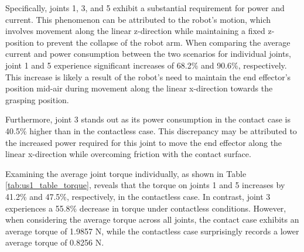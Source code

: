 \documentclass[report.tex]{subfiles}
\begin{document}
    Specifically, joints 1, 3, and 5 exhibit a substantial requirement for power and current. This phenomenon can be attributed to the robot's motion, which involves movement along the linear z-direction while maintaining a fixed z-position to prevent the collapse of the robot arm. When comparing the average current and power consumption between the two scenarios for individual joints, joint 1 and 5 experience significant increases of 68.2\% and 90.6\%, respectively. This increase is likely a result of the robot's need to maintain the end effector's position mid-air during movement along the linear x-direction towards the grasping position.
    
    Furthermore, joint 3 stands out as its power consumption in the contact case is 40.5\% higher than in the contactless case. This discrepancy may be attributed to the increased power required for this joint to move the end effector along the linear x-direction while overcoming friction with the contact surface.
    
    Examining the average joint torque individually, as shown in Table \ref{tab:us1_table_torque}, reveals that the torque on joints 1 and 5 increases by 41.2\% and 47.5\%, respectively, in the contactless case. In contrast, joint 3 experiences a 55.8\% decrease in torque under contactless conditions. However, when considering the average torque across all joints, the contact case exhibits an average torque of 1.9857 N, while the contactless case surprisingly records a lower average torque of 0.8256 N.
    
\end{document}
